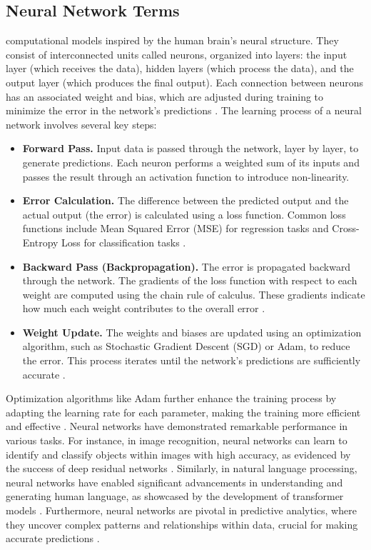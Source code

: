 \documentclass{ieeeaccess}
\begin{document}
\subsection{Neural Network Terms}
\label{subsec:network_terms}
computational models inspired by the human brain's neural structure. They consist of interconnected units called neurons, organized into layers: the input layer (which receives the data), hidden layers (which process the data), and the output layer (which produces the final output). Each connection between neurons has an associated weight and bias, which are adjusted during training to minimize the error in the network's predictions \cite{lecun2015deep}.
The learning process of a neural network involves several key steps:
\begin{itemize}
    \item \textbf{Forward Pass.} Input data is passed through the network, layer by layer, to generate predictions. Each neuron performs a weighted sum of its inputs and passes the result through an activation function to introduce non-linearity.
    \item \textbf{Error Calculation.} The difference between the predicted output and the actual output (the error) is calculated using a loss function. Common loss functions include Mean Squared Error (MSE) for regression tasks and Cross-Entropy Loss for classification tasks \cite{goodfellow2016deep}.
    \item \textbf{Backward Pass (Backpropagation).} The error is propagated backward through the network. The gradients of the loss function with respect to each weight are computed using the chain rule of calculus. These gradients indicate how much each weight contributes to the overall error \cite{rumelhart1986learning}.
    \item \textbf{Weight Update.} The weights and biases are updated using an optimization algorithm, such as Stochastic Gradient Descent (SGD) or Adam, to reduce the error. This process iterates until the network's predictions are sufficiently accurate \cite{kingma2014adam}.
\end{itemize}
Optimization algorithms like Adam further enhance the training process by adapting the learning rate for each parameter, making the training more efficient and effective \cite{kingma2014adam}.
Neural networks have demonstrated remarkable performance in various tasks. For instance, in image recognition, neural networks can learn to identify and classify objects within images with high accuracy, as evidenced by the success of deep residual networks \cite{he2016deep}. Similarly, in natural language processing, neural networks have enabled significant advancements in understanding and generating human language, as showcased by the development of transformer models \cite{vaswani2017attention}. Furthermore, neural networks are pivotal in predictive analytics, where they uncover complex patterns and relationships within data, crucial for making accurate predictions \cite{schmidhuber2015deep}.
\end{document}
